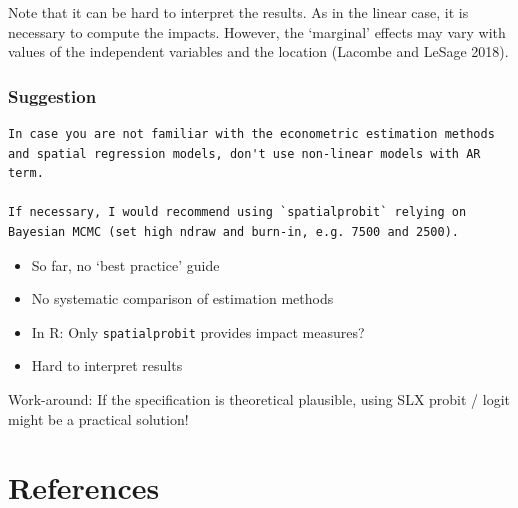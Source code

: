 \documentclass[
  letterpaper,
]{scrbook}
\begin{document}
Note that it can be hard to interpret the results. As in the linear
case, it is necessary to compute the impacts. However, the `marginal'
effects may vary with values of the independent variables and the
location (Lacombe and LeSage 2018).

\hypertarget{suggestion}{%
\subsection{Suggestion}\label{suggestion}}

\begin{verbatim}
In case you are not familiar with the econometric estimation methods and spatial regression models, don't use non-linear models with AR term. 

If necessary, I would recommend using `spatialprobit` relying on Bayesian MCMC (set high ndraw and burn-in, e.g. 7500 and 2500).
\end{verbatim}

\begin{itemize}
\item
  So far, no `best practice' guide
\item
  No systematic comparison of estimation methods
\item
  In R: Only \texttt{spatialprobit} provides impact measures?
\item
  Hard to interpret results
\end{itemize}

Work-around: If the specification is theoretical plausible, using SLX
probit / logit might be a practical solution!


\hypertarget{references}{%
\chapter*{References}\label{references}}

\end{document}

